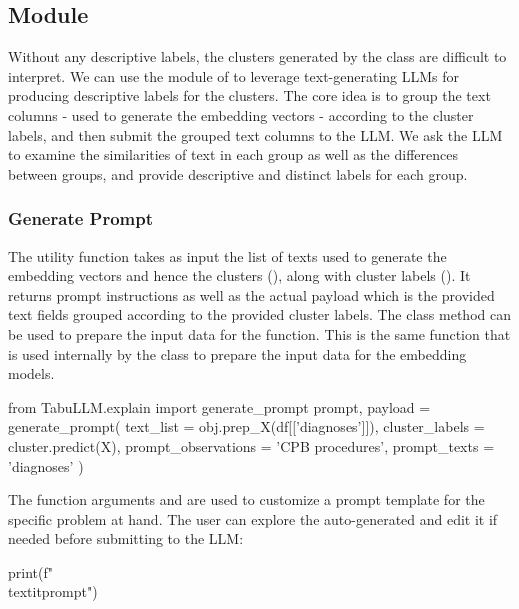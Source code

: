 \documentclass[article]{jss}
\begin{document}
\subsection[explain Module]{ Module}\label{subsec:using-explain}

Without any descriptive labels, the clusters generated by the  class are difficult to interpret. We can use the  module of  to leverage text-generating LLMs for producing descriptive labels for the clusters. The core idea is to group the text columns - used to generate the embedding vectors - according to the cluster labels, and then submit the grouped text columns to the LLM. We ask the LLM to examine the similarities of text in each group as well as the differences between groups, and provide descriptive and distinct labels for each group.

\subsubsection{Generate Prompt}\label{subsubsec:using-explain-prompt}

The utility function  takes as input the list of texts used to generate the embedding vectors and hence the clusters (), along with cluster labels (). It returns prompt instructions as well as the actual payload which is the provided text fields grouped according to the provided cluster labels. The class method  can be used to prepare the input data for the  function. This is the same function that is used internally by the class  to prepare the input data for the embedding models.
\begin{pyblock}
from TabuLLM.explain import generate_prompt
prompt, payload = generate_prompt(
    text_list = obj.prep_X(df[['diagnoses']]),
    cluster_labels = cluster.predict(X),
    prompt_observations = 'CPB procedures',
    prompt_texts = 'diagnoses'
)
\end{pyblock}

The function arguments  and  are used to customize a prompt template for the specific problem at hand. The user can explore the auto-generated  and edit it if needed before submitting to the LLM:
\begin{pyblock}
print(f"\\textit{{{prompt}}}")
\end{pyblock}
\stdoutpythontex
  
\end{document}
